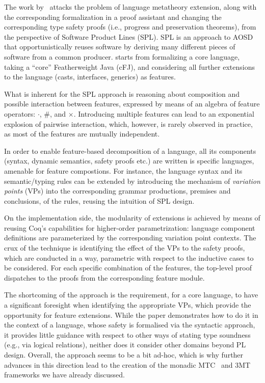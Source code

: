 The work by~\citet{Delaware2011} attacks the problem of language
metatheory extension, along with the corresponding formalization in a
proof assistant and changing the corresponding
type safety proofs (i.e., progress and preservation theorems), from
the perspective of Software Product Lines (SPL). SPL is an approach to AOSD
that opportunistically reuses software by deriving many different pieces of software
from a common producer. %
\citet{Delaware2011} starts from formalizing a core language, taking a ``core'' Featherweight Java
(cFJ), and considering all further extensions to the language (casts,
interfaces, generics) as features.

What is inherent for the SPL approach is reasoning about composition
and possible interaction between features, expressed by means of an
algebra of feature operators: $\cdot$, $\#$, and $\times$. Introducing
multiple features can lead to an exponential explosion of pairwise
interaction, which, however, is rarely observed in practice, as most
of the features are mutually independent.

In order to enable feature-based decomposition of a language, all its
components (syntax, dynamic semantics, safety proofs etc.) are written
is specific languages, amenable for feature compostions. For instance,
the language syntax and its semantic/typing rules can be extended by
introducing the mechanism of \emph{variation points} (VPs) into the
corresponding grammar productions, premises and conclusions, of the
rules, reusing the intuition of SPL design.

On the implementation side, the modularity of extensions is achieved
by means of reusing Coq's capabilities for higher-order
parametrization: language component definitions are parameterized by
the corresponding variation point contexts. The crux of the technique
is identifying the effect of the VPs to the safety proofs, which are
conducted in a way, parametric with respect to the inductive cases to
be considered. For each specific combination of the features, the
top-level proof dispatches to the proofs from the corresponding
feature module.

The shortcoming of the approach is the requirement, for a core
language, to have a significant foresight when identifying the
appropriate VPs, which provide the opportunity for feature extensions.
While the paper demonstrates how to do it in the context of a
language, whose safety is formalised via the syntactic approach, it
provides little guidance with respect to other ways of stating type
soundness (e.g., via logical relations), neither does it consider
other domains beyond PL design. Overall, the approach seems to be a
bit ad-hoc, which is why further advances in this direction lead to
the creation of the monadic MTC~\citep{Delaware2013POPL} and 3MT~\citep{Delaware2013ICFP} frameworks we have already discussed.

